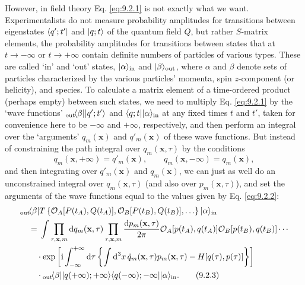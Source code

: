 However, in field theory Eq. \eqref{eq:9.2.1} is not exactly what we want.
Experimentalists do not measure probability amplitudes for transitions
between eigenstates $\langle q';t'\rvert$ and $\lvert q;t\rangle$ of the quantum field $Q$,
but rather $S$-matrix elements, the probability amplitudes for transitions
between states that at $t\to-\infty$ or $t\to+\infty$ contain definite
numbers of particles of various types. These are called `in' and `out' states,
$\lvert \alpha\rangle_{\mathrm{in}}$ and $\lvert \beta\rangle_{\mathrm{out}}$, where $\alpha$
and $\beta$ denote sets of particles characterized by the various particles'
momenta, spin $z$-component (or helicity), and species. To calculate a matrix
element of a time-ordered product (perhaps empty) between such states, we
need to multiply Eq. \eqref{eq:9.2.1} by the `wave functions'
${}_{\mathrm{out}}\!\langle \beta\rvert\lvert q';t'\rangle$ and
$\langle q;t\rvert\lvert \alpha\rangle_{\mathrm{in}}$ at any fixed times $t$ and $t'$, taken
for convenience here to be $-\infty$ and $+\infty$, respectively, and then
perform an integral over the `arguments' $q_m(\mathbf{x})$ and
$q'_m(\mathbf{x})$ of these wave functions. But instead of constraining the
path integral over $q_m(\mathbf{x},\tau)$ by the conditions
\begin{equation}
  q_m(\mathbf{x},+\infty)=q'_m(\mathbf{x}),
  \qquad
  q_m(\mathbf{x},-\infty)=q_m(\mathbf{x}),
  \tag{9.2.2}\label{eq:9.2.2}
\end{equation}
and then integrating over $q'_m(\mathbf{x})$ and $q_m(\mathbf{x})$, we can
just as well do an unconstrained integral over $q_m(\mathbf{x},\tau)$ (and
also over $p_m(\mathbf{x},\tau)$), and set the arguments of the wave
functions equal to the values given by Eq. \eqref{eq:9.2.2}:
\begin{align}
  &{}_{\mathrm{out}}\!\langle \beta\rvert T\left\{
  \mathcal{O}_A[P(t_A),Q(t_A)],
  \mathcal{O}_B[P(t_B),Q(t_B)],\ldots\right\}\lvert \alpha\rangle_{\mathrm{in}}
  \notag\\
  &\quad={}
  \int\prod_{\tau,\mathbf{x},m}\mathop{}\!\mathrm{d} q_m(\mathbf{x},\tau)
  \prod_{\tau,\mathbf{x},m}\frac{\mathop{}\!\mathrm{d} p_m(\mathbf{x},\tau)}{2\pi}
  \mathcal{O}_A[p(t_A),q(t_A)]\mathcal{O}_B[p(t_B),q(t_B)]\cdots
  \notag\\
  &\qquad\cdot\exp\left[\mathrm{i}\int_{-\infty}^{+\infty}\mathop{}\!\mathrm{d}\tau
  \left\{\int \mathop{}\!\mathrm{d}^3x\,\dot q_m(\mathbf{x},\tau)p_m(\mathbf{x},\tau)
  -H[q(\tau),p(\tau)]\right\}\right]
  \notag\\
  &\qquad\cdot
  {}_{\mathrm{out}}\!\langle \beta\rvert\lvert q(+\infty);+\infty\rangle
  \langle q(-\infty);-\infty\rvert\lvert \alpha\rangle_{\mathrm{in}}.
  \tag{9.2.3}\label{eq:9.2.3}
\end{align}
